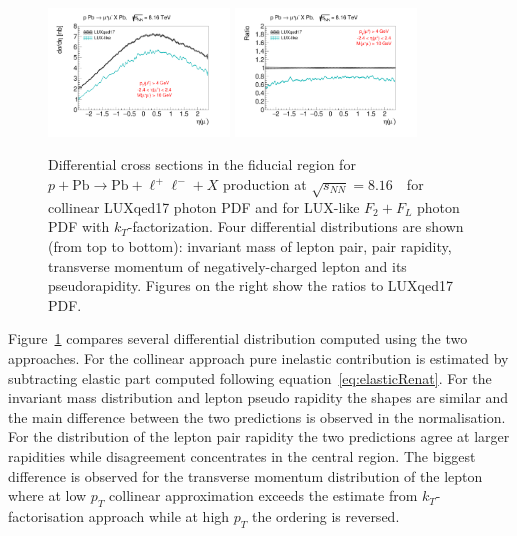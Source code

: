 \begin{figure}[]
\includegraphics[width=0.43\textwidth]{figures/etal_inc_cut_kt.pdf}
\includegraphics[width=0.43\textwidth]{figures/Ratioetal_inc_cut_kt.pdf}
\caption{Differential cross sections in the fiducial region for $p+\textrm{Pb}\rightarrow \textrm{Pb} + \ell^+\ell^- + X$ production at $\sqrt{s_{N N}} = 8.16$~\TeV\ for collinear LUXqed17 photon PDF and
for LUX-like $F_2+F_L$ photon PDF with $k_T$-factorization.
Four differential distributions are shown (from top to bottom): invariant mass of lepton pair, pair rapidity, transverse momentum of negatively-charged lepton and its pseudorapidity. Figures on the right show the ratios to LUXqed17 PDF.}
\label{fig:inc_cut_kt}
\end{figure}

Figure~\ref{fig:inc_cut_kt} compares several differential distribution computed using the two approaches. For the collinear approach pure inelastic contribution is estimated by
subtracting elastic part computed following equation~\ref{eq:elasticRenat}.
For the invariant mass distribution and lepton pseudo rapidity the shapes are similar and
the main difference between the two predictions is observed in the normalisation.
For the distribution of the lepton pair rapidity the two predictions agree at larger rapidities while disagreement concentrates
in the central region. The biggest difference is observed for the transverse momentum distribution of the lepton where at low $p_T$ collinear approximation exceeds the estimate
from $k_T$-factorisation approach while at high $p_T$ the ordering is reversed.  
